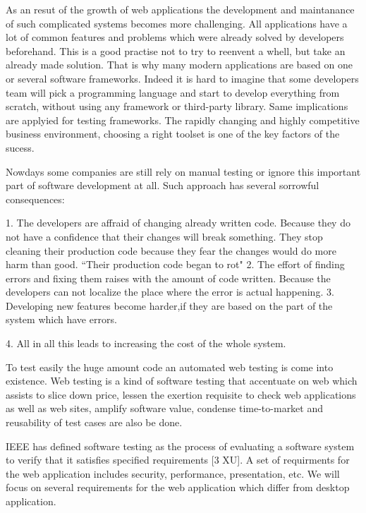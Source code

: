 		As an resut of the growth of web applications the development and maintanance
		of  such complicated systems becomes more challenging.	All
		applications have a lot of common features and problems which	were already solved by developers beforehand. This is a good practise not to
		try to reenvent a whell, but take an already made solution. That is why many
		modern applications are based on one or several software frameworks. Indeed it is hard to imagine that some developers team will pick a programming
		language and start to develop everything from scratch, without using any
		framework or third-party library. Same implications are applyied for testing
		frameworks. The rapidly changing and highly competitive business environment,
		choosing a right toolset is one of the key factors of the sucess. 
		
		Nowdays some companies are still rely on manual testing or ignore this
		important part of software development at all. Such approach has several
		sorrowful consequences:
		
		1. The developers are affraid of changing already written
		code. Because they do not have a confidence that their changes will break something. They
			stop cleaning their production code because they fear the changes would
			do more harm than good. ``Their production code began to rot"
			\cite[p.123]{cleanCode} 
		2. The effort of finding errors and
			fixing them raises with the amount of code written. Because the developers can not localize the place where the error is
		actual happening.
		3. Developing new features become harder,if they are based on the part of the
		system which have errors.
		
		4. All in all this leads to increasing the cost of the whole system.
	 	
	 	 To test easily the huge amount code an automated web testing is come into
	 	 existence.
	 	 Web testing is a kind of software testing that accentuate on web which assists to slice down price,
	     lessen the exertion requisite to check web applications as well as web
	      sites, amplify software value, condense time-to-market and reusability of
	      test cases are also be done.
	   
		IEEE has defined software testing as the process of evaluating a software
		system to verify that it satisfies specified requirements [3 XU]. A set of
		requirments for the web application includes security, performance,
		presentation, etc. We will focus on several requirements for the web
		application which differ from desktop application. 
		

